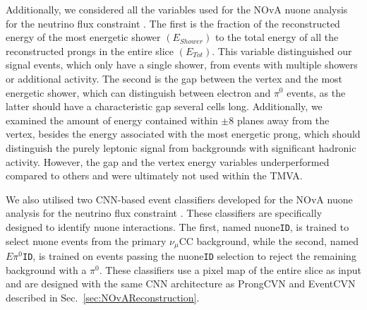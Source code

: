 Additionally, we considered all the variables used for the \gls{NOvA} \gls{nuone} analysis for the neutrino flux constraint \cite{NOVA-doc-56383}. The first is the fraction of the reconstructed energy of the most energetic shower $\left(E_{Shower}\right)$ to the total energy of all the reconstructed prongs in the entire slice $\left(E_{Tot}\right)$. This variable distinguished our signal events, which only have a single shower, from events with multiple showers or additional activity. The second is the gap between the vertex and the most energetic shower, which can distinguish between electron and $\pi^0$ events, as the latter should have a characteristic gap several cells long. Additionally, we examined the amount of energy contained within $\pm8$ planes away from the vertex, besides the energy associated with the most energetic prong, which should distinguish the purely leptonic signal from backgrounds with significant hadronic activity. However, the gap and the vertex energy variables underperformed compared to others and were ultimately not used within the \gls{TMVA}.

We also utilised two \gls{CNN}-based event classifiers developed for the \gls{NOvA} \gls{nuone} analysis for the neutrino flux constraint \cite{NOVA-doc-56383, Nuone_Neutrino2022Poster}. These classifiers are specifically designed to identify \gls{nuone} interactions. The first, named \gls{nuone}\texttt{ID}, is trained to select \gls{nuone} events from the primary $\nu_\mu$\gls{CC} background, while the second, named $E\pi^0$\texttt{ID}, is trained on events passing the \gls{nuone}\texttt{ID} selection to reject the remaining background with a $\pi^0$. These classifiers use a pixel map of the entire slice as input and are designed with the same \gls{CNN} architecture as ProngCVN and EventCVN described in Sec.~\ref{sec:NOvAReconstruction}.

